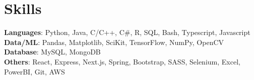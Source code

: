 \section{Skills}
 \begin{itemize}[leftmargin=0.15in, label={}]
    \small{\item{

     \textbf{Languages}{: Python, Java, C/C++, C\#, R, SQL, Bash, Typescript, Javascript} \\
     \textbf{Data/ML}{: Pandas, Matplotlib, SciKit, TensorFlow, NumPy, OpenCV} \\
     \textbf{Database}{: MySQL, MongoDB} \\
     \textbf{Others}{: React, Express, Next.js, Spring, Bootstrap, SASS, Selenium, Excel, PowerBI, Git, AWS} \\
    }}
 \end{itemize}
